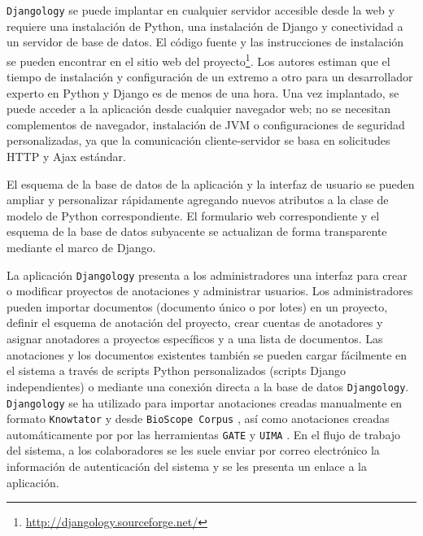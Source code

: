 \texttt{Djangology} se puede implantar en cualquier servidor accesible desde la web y requiere una instalación de Python, una instalación de Django y conectividad a un servidor de base de datos.
El código fuente y las instrucciones de instalación se pueden encontrar en el sitio web del proyecto\footnote{\url{http://djangology.sourceforge.net/}}.
Los autores estiman que el tiempo de instalación y configuración de un extremo a otro para un desarrollador experto en Python y Django es de menos de una hora.
Una vez implantado, se puede acceder a la aplicación desde cualquier navegador web; no se necesitan complementos de navegador, instalación de JVM o configuraciones de seguridad personalizadas, ya que la comunicación cliente-servidor se basa en solicitudes HTTP y Ajax estándar.

El esquema de la base de datos de la aplicación y la interfaz de usuario se pueden ampliar y personalizar rápidamente agregando nuevos atributos a la clase de modelo de Python correspondiente. El formulario web correspondiente y el esquema de la base de datos subyacente se actualizan de forma transparente mediante el marco de Django.

La aplicación \texttt{Djangology} presenta a los administradores una interfaz para crear o modificar proyectos de anotaciones y administrar usuarios.
Los administradores pueden importar documentos (documento único o por lotes) en un proyecto, definir el esquema de anotación del proyecto, crear cuentas de anotadores y asignar anotadores a proyectos específicos y a una lista de documentos.
Las anotaciones y los documentos existentes también se pueden cargar fácilmente en el sistema a través de scripts Python personalizados (scripts Django independientes) o mediante una conexión directa a la base de datos \texttt{Djangology}.
\texttt{Djangology} se ha utilizado para importar anotaciones creadas manualmente en formato \texttt{Knowtator} y desde \texttt{BioScope Corpus} \cite{szarvas2008bioscope}, así como anotaciones creadas automáticamente por por las herramientas \texttt{GATE} y \texttt{UIMA} \cite{ferrucci2004uima}.
En el flujo de trabajo del sistema, a los colaboradores se les suele enviar por correo electrónico la información de autenticación del sistema y se les presenta un enlace a la aplicación.

